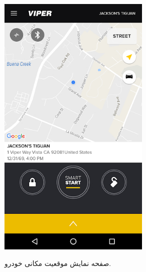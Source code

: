 \documentclass[a4paper,12pt]{report}
\begin{document}
\begin{figure}[!h]
		\begin{subfigure}[t]{0.3\linewidth}
			\centering
			\includegraphics[width=0.8\textwidth]{resources/viper_smart_start_1.jpg}
			\label{subfig3:fig1:sec3:chap1}
			\caption{
				صفحه نمایش موقعیت مکانی خودرو.
			}
		\end{subfigure}
		\hspace*{1cm}
		\begin{subfigure}[t]{0.3\linewidth}
			\centering

\end{subfigure}
\end{figure}
\end{document}
